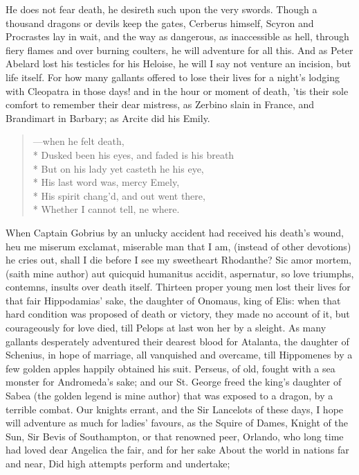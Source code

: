 {He does not fear death, he desireth such upon the very swords. Though a
thousand dragons or devils keep the gates, Cerberus himself, Scyron and
Procrastes lay in wait, and the way as dangerous, as inaccessible as
hell, through fiery flames and over burning coulters, he will adventure
for all this. And as Peter Abelard lost his testicles for his
Heloise, he will I say not venture an incision, but life itself. For
how many gallants offered to lose their lives for a night's lodging
with Cleopatra in those days! and in the hour or moment of death, 'tis
their sole comfort to remember their dear mistress, as Zerbino
slain in France, and Brandimart in Barbary; as Arcite did his Emily.
%
{\gothfont
\begin{verse}
---when he felt death,\\*
Dusked been his eyes, and faded is his breath\\*
But on his lady yet casteth he his eye,\\*
His last word was, mercy Emely,\\*
His spirit chang'd, and out went there,\\*
Whether I cannot tell, ne where.
\end{verse}
}
%
When Captain Gobrius by an unlucky accident had received his
death's wound, heu me miserum exclamat, miserable man that I am,
(instead of other devotions) he cries out, shall I die before I see my
sweetheart Rhodanthe? Sic amor mortem, (saith mine author) aut quicquid
humanitus accidit, aspernatur, so love triumphs, contemns, insults over
death itself. Thirteen proper young men lost their lives for that fair
Hippodamias' sake, the daughter of Onomaus, king of Elis: when that
hard condition was proposed of death or victory, they made no account
of it, but courageously for love died, till Pelops at last won her by a
sleight. As many gallants desperately adventured their dearest
blood for Atalanta, the daughter of Schenius, in hope of marriage, all
vanquished and overcame, till Hippomenes by a few golden apples happily
obtained his suit. Perseus, of old, fought with a sea monster for
Andromeda's sake; and our St. George freed the king's daughter of Sabea
(the golden legend is mine author) that was exposed to a dragon, by a
terrible combat. Our knights errant, and the Sir Lancelots of these
days, I hope will adventure as much for ladies' favours, as the Squire
of Dames, Knight of the Sun, Sir Bevis of Southampton, or that renowned
peer,
Orlando, who long time had loved dear
Angelica the fair, and for her sake
About the world in nations far and near,
Did high attempts perform and undertake;

}
